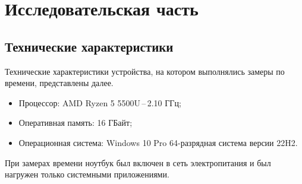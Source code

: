 \chapter{Исследовательская часть}

\section{Технические характеристики}
Технические характеристики устройства, на котором выполнялись замеры по времени, представлены далее.

\begin{itemize}
	\item Процессор: AMD Ryzen 5 5500U\,--\,2.10 ГГц;
	\item Оперативная память: 16 ГБайт;
	\item Операционная система: Windows 10 Pro 64-разрядная система версии 22H2.
\end{itemize}

При замерах времени ноутбук был включен в сеть электропитания и был нагружен только системными приложениями.

